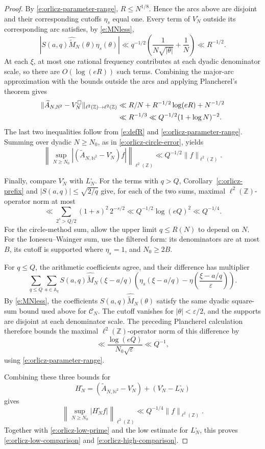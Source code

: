 \documentclass[12pt,reqno]{amsart}
\numberwithin{equation}{section}
\theoremstyle{definition}
\theoremstyle{remark}
\begin{document}
\begin{proof}
By \eqref{e:orlicz-parameter-range}, \(R\leq N^{1/8}\).
Hence the arcs above are disjoint and their corresponding
cutoffs \(\eta_s\) equal one.
Every term of \(V_N^\square\) outside its corresponding arc
satisfies, by \eqref{e:MNless},
\[
 |S(a,q)\widehat{\widetilde M}_N(\theta)\eta_s(\theta)|
 \ll
 q^{-1/2}\left(\frac1{N\sqrt{|\theta|}}+\frac1N\right)
 \ll R^{-1/2}.
\]
At each \(\xi\), at most one rational frequency contributes at
each dyadic denominator scale, so there are
\(O(\log(eR))\) such terms.
Combining the major-arc approximation with the bounds outside
the arcs and applying Plancherel's theorem gives
\begin{align}\label{e:orlicz-square-error}
 \|\widetilde A_{N,\mathbb N^2}-V_N^\square\|
 _{\ell^2(\mathbb Z)\to\ell^2(\mathbb Z)}
 &\ll
 R/N+R^{-1/2}\log(eR)+N^{-1/2}
 \notag\\
 &\ll R^{-1/3}
 \ll Q^{-1/2}(1+\log N)^{-2}.
\end{align}
The last two inequalities follow from \eqref{e:defR} and
\eqref{e:orlicz-parameter-range}.
Summing over dyadic \(N\geq N_0\), as in
\eqref{e:orlicz-circle-error}, yields
\[
 \left\|
 \sup_{N\geq N_0}
 |(\widetilde A_{N,\mathbb N^2}-V_N^\square)f|
 \right\|_{\ell^2(\mathbb Z)}
 \ll Q^{-1/2}\|f\|_{\ell^2(\mathbb Z)}.
\]

Finally, compare \(V_N^\square\) with \(L_N^\square\).
For the terms with \(q>Q\), Corollary~\ref{c:orlicz-prefix}
and \(|S(a,q)|\leq\sqrt{2/q}\) give, for each of the two sums,
maximal \(\ell^2(\mathbb Z)\)-operator norm at most
\[
 \ll
 \sum_{2^s>Q/2}(1+s)^2\,2^{-s/2}
 \ll Q^{-1/2}\log(eQ)^2
 \ll Q^{-1/4}.
\]
For the circle-method sum, allow the upper limit
\(q\leq R(N)\) to depend on \(N\).
For the Ionescu--Wainger sum, use the filtered form: its
denominators are at most \(B\), its cutoff is supported where
\(\eta_s=1\), and \(N_0\geq2B\).

For \(q\leq Q\), the arithmetic coefficients agree, and their
difference has multiplier
\[
 \sum_{q\leq Q}\sum_{a\in\mathbb A_q}
 S(a,q)\widehat{\widetilde M}_N(\xi-a/q)
 \left(
 \eta_s(\xi-a/q)
 -
 \eta\left(\frac{\xi-a/q}{\varepsilon}\right)
 \right).
\]
By \eqref{e:MNless}, the coefficients
\(S(a,q)\widehat{\widetilde M}_N(\theta)\) satisfy the same
dyadic square-sum bound used above for \(\mathcal C_N\).
The cutoff vanishes for \(|\theta|<\varepsilon/2\), and the
supports are disjoint at each denominator scale.
The preceding Plancherel calculation therefore bounds the
maximal \(\ell^2(\mathbb Z)\)-operator norm of this difference by
\[
 \ll
 \frac{\log(eQ)}{N_0\sqrt\varepsilon}
 \ll Q^{-1},
\]
using \eqref{e:orlicz-parameter-range}.

Combining these three bounds for
\[
 H_N^\square
 =
 (\widetilde A_{N,\mathbb N^2}-V_N^\square)
 +(V_N^\square-L_N^\square)
\]
gives
\[
 \left\|
 \sup_{N\geq N_0}|H_N^\square f|
 \right\|_{\ell^2(\mathbb Z)}
 \ll Q^{-1/4}\|f\|_{\ell^2(\mathbb Z)}.
\]
Together with \eqref{e:orlicz-low-prime} and the low estimate
for \(L_N^\square\), this proves
\eqref{e:orlicz-low-comparison} and
\eqref{e:orlicz-high-comparison}.
\end{proof}
\end{document}
